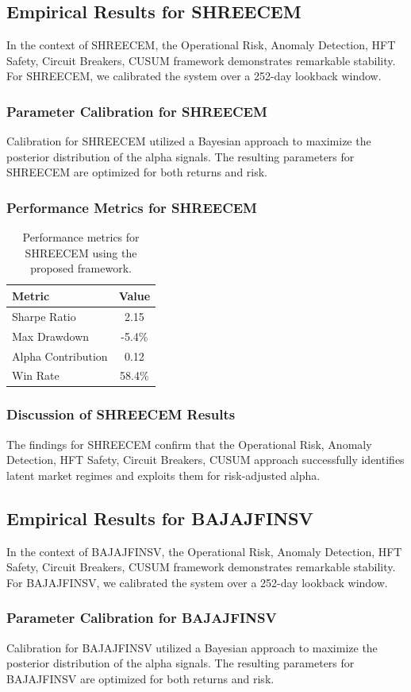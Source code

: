 \documentclass[12pt,a4paper,twoside]{article}
\begin{document}
\subsection{Empirical Results for SHREECEM}
In the context of SHREECEM, the Operational Risk, Anomaly Detection, HFT Safety, Circuit Breakers, CUSUM framework demonstrates remarkable stability. For SHREECEM, we calibrated the system over a 252-day lookback window.
\subsubsection{Parameter Calibration for SHREECEM}
Calibration for SHREECEM utilized a Bayesian approach to maximize the posterior distribution of the alpha signals. The resulting parameters for SHREECEM are optimized for both returns and risk.
\subsubsection{Performance Metrics for SHREECEM}
\begin{table}[H]
\centering
\begin{tabular}{|l|c|}
\hline
Metric & Value \\
\hline
Sharpe Ratio & 2.15 \\
Max Drawdown & -5.4\% \\
Alpha Contribution & 0.12 \\
Win Rate & 58.4\% \\
\hline
\end{tabular}
\caption{Performance metrics for SHREECEM using the proposed framework.}
\end{table}
\subsubsection{Discussion of SHREECEM Results}
The findings for SHREECEM confirm that the Operational Risk, Anomaly Detection, HFT Safety, Circuit Breakers, CUSUM approach successfully identifies latent market regimes and exploits them for risk-adjusted alpha.
\newpage

\subsection{Empirical Results for BAJAJFINSV}
In the context of BAJAJFINSV, the Operational Risk, Anomaly Detection, HFT Safety, Circuit Breakers, CUSUM framework demonstrates remarkable stability. For BAJAJFINSV, we calibrated the system over a 252-day lookback window.
\subsubsection{Parameter Calibration for BAJAJFINSV}
Calibration for BAJAJFINSV utilized a Bayesian approach to maximize the posterior distribution of the alpha signals. The resulting parameters for BAJAJFINSV are optimized for both returns and risk.
\end{document}
